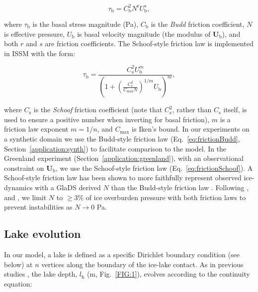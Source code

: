 \documentclass[tc, manuscript]{copernicus}
\begin{document}
\begin{equation}
\label{eq:frictionBudd}
\tau_{\mathrm{b}} = C^{2}_{\mathrm{b}} N^{\mathrm{r}} U_{\mathrm{b}}^{s} ,
\end{equation}

\noindent
where $\tau_{\mathrm{b}}$ is the basal stress magnitude (Pa), $C_{\mathrm{b}}$ is the \textit{Budd} friction coefficient, $N$ is effective pressure, $U_{\mathrm{b}}$ is basal velocity magnitude (the modulus of $\mathbf{U}_{\mathrm{b}}$), and both $r$ and $s$ are friction coefficients. The Schoof-style friction law is implemented in ISSM with the form: 

\begin{equation}
\label{eq:frictionSchoof}
\tau_{\mathrm{b}}=\frac{C_{\mathrm{s}}^2 U_{\mathrm{b}}^m}{\left(1+\left(\frac{C_{\mathrm{s}}^2}{C_{\max } N}\right)^{1 / m} U_{\mathrm{b}}\right)^m},
\end{equation}

\noindent
where $C_{\mathrm{s}}$ is the \textit{Schoof} friction coefficient (note that $C_{\mathrm{s}}^{2}$, rather than $C_{\mathrm{s}}$ itself, is used to ensure a positive number when inverting for basal friction), $m$ is a friction law exponent $m = 1/n$, and $C_{\mathrm{max}}$ is Iken's bound. In our experiments on a synthetic domain we use the Budd-style friction law (Eq.~\ref{eq:frictionBudd}, Section~\ref{application:synth}) to facilitate comparison to the \citet{kingslake2013modelling} model. In the Greenland experiment (Section~\ref{application:greenland}), with an observational constraint on $\mathbf{U}_{\mathrm{b}}$, we use the Schoof-style friction law (Eq.~\ref{eq:frictionSchoof}). A Schoof-style friction law has been shown to more faithfully represent observed ice-dynamics with a GlaDS derived $N$ than the Budd-style friction law \citep{mcarthur2023basal}. Following \citet{mcarthur2023basal}, and \citet{ehrenfeucht2023seasonal}, we limit $N$ to $\geq$3\% of ice overburden pressure with both friction laws to prevent instabilities as $N \to 0$ Pa. 

\subsection{Lake evolution}\label{methods:Lake}

In our model, a lake is defined as a specific Dirichlet boundary condition (see below)  at $n$ vertices along the boundary of the ice-lake contact. As in previous studies \citep[e.g.,][]{kingslake2013modelling}, the lake depth, $l_{\mathrm{h}}$ ($\mathrm{m}$, Fig.~\ref{FIG:1}), evolves according to the continuity equation:
\end{document}
